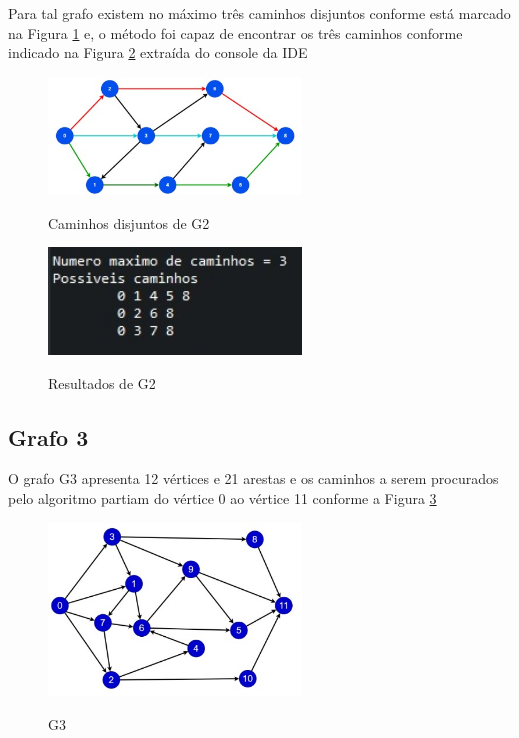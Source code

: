 Para tal grafo existem no máximo três caminhos disjuntos conforme está marcado na Figura \ref{caminhos-grafo2} e, o método foi capaz de encontrar os três caminhos conforme indicado na Figura \ref{solucao-grafo2} extraída do console da IDE

\begin{figure}[H]
    \centering
    \caption{Caminhos disjuntos de G2}
    \includegraphics[width=0.6\textwidth]{figuras/caminhos-grafo2.png}
    \label{caminhos-grafo2}
\end{figure}


\begin{figure}[H]
    \centering
    \caption{Resultados de G2}
    \includegraphics[width=0.6\textwidth]{figuras/solucao-grafo2.png}
    \label{solucao-grafo2}
\end{figure}
    
\subsection{\esp Grafo 3}

O grafo G3 apresenta 12 vértices e 21 arestas e os caminhos a serem procurados pelo algoritmo partiam do vértice 0 ao vértice 11 conforme a Figura \ref{grafo3}

\begin{figure}[H]
    \centering
    \caption{G3}
    \includegraphics[width=0.6\textwidth]{figuras/grafo3.png}
    \label{grafo3}
\end{figure}

